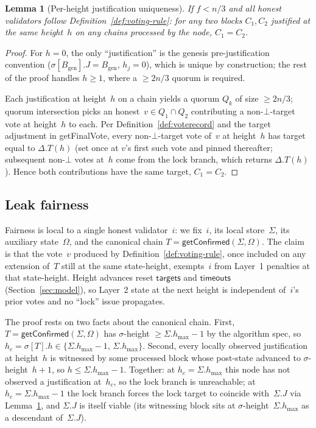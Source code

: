 \documentclass{article}
\newcommand{\genesis}{\ensuremath{B_{\mathrm{gen}}}}
\newcommand{\targets}{\mathsf{targets}}
\newcommand{\timeouts}{\mathsf{timeouts}}
\newcommand{\hmax}{\ensuremath{h_{\max}}\xspace}
\newcommand{\getFinalVote}{\textsf{getFinalVote}\xspace}
\newcommand{\getConfirmed}{\textsf{getConfirmed}\xspace}
\theoremstyle{plain}
\newtheorem{lemma}{Lemma}
\theoremstyle{definition}
\theoremstyle{remark}
\begin{document}
\begin{lemma}[Per-height justification uniqueness]\label{lem:just-unique-height}
If $f < n/3$ and all honest validators follow Definition~\ref{def:voting-rule}: for any two blocks $C_1, C_2$ justified at the same height~$h$ on any chains processed by the node, $C_1 = C_2$.
\end{lemma}

\begin{proof}
For $h = 0$, the only ``justification'' is the genesis pre-justification convention ($\sigma[\genesis].J = \genesis$, $h_j = 0$), which is unique by construction; the rest of the proof handles $h \geq 1$, where a $\geq 2n/3$ quorum is required.

Each justification at height~$h$ on a chain yields a quorum $Q_k$ of size $\geq 2n/3$; quorum intersection picks an honest~$v \in Q_1 \cap Q_2$ contributing a non-$\bot$-target vote at height~$h$ to each.
Per Definition~\ref{def:voterecord} and the target adjustment in \getFinalVote, every non-$\bot$-target vote of~$v$ at height~$h$ has target equal to $\Delta.T(h)$ (set once at $v$'s first such vote and pinned thereafter; subsequent non-$\bot$ votes at~$h$ come from the lock branch, which returns $\Delta.T(h)$).
Hence both contributions have the same target, $C_1 = C_2$.
\end{proof}

\subsection{Leak fairness}

Fairness is local to a single honest validator~$i$: we fix~$i$, its local store~$\Sigma$, its auxiliary state~$\Omega$, and the canonical chain $T = \getConfirmed(\Sigma, \Omega)$.
The claim is that the vote~$v$ produced by Definition~\ref{def:voting-rule}, once included on any extension of~$T$ still at the same state-height, exempts~$i$ from Layer~1 penalties at that state-height.
Height advances reset $\targets$ and $\timeouts$ (Section~\ref{sec:model}), so Layer~2 state at the next height is independent of~$i$'s prior votes and no ``lock'' issue propagates.

The proof rests on two facts about the canonical chain.
First, $T = \getConfirmed(\Sigma,\Omega)$ has $\sigma$-height $\geq \Sigma.\hmax - 1$ by the algorithm spec, so $h_c = \sigma[T].h \in \{\Sigma.\hmax - 1,\, \Sigma.\hmax\}$.
Second, every locally observed justification at height~$h$ is witnessed by some processed block whose post-state advanced to $\sigma$-height~$h+1$, so $h \leq \Sigma.\hmax - 1$.
Together: at $h_c = \Sigma.\hmax$ this node has not observed a justification at~$h_c$, so the lock branch is unreachable; at $h_c = \Sigma.\hmax - 1$ the lock branch forces the lock target to coincide with~$\Sigma.J$ via Lemma~\ref{lem:just-unique-height}, and $\Sigma.J$ is itself viable (its witnessing block sits at $\sigma$-height~$\Sigma.\hmax$ as a descendant of~$\Sigma.J$).
\end{document}
